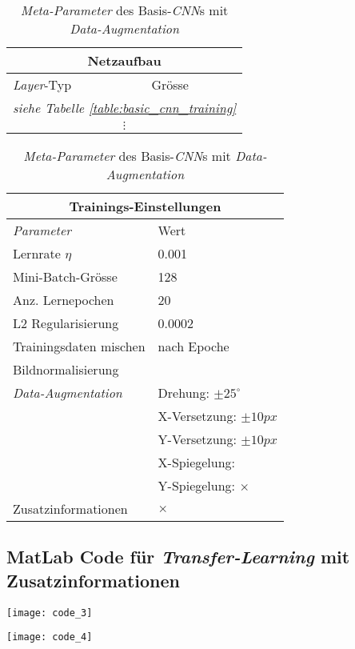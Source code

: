 \begin{table}[!htb]
	\def\arraystretch{1.4}
	\centering
	\begin{subtable}[t]{.5\linewidth}
		\begin{tabular}[t]{l | l }
			\multicolumn{2}{c}{\textbf{Netzaufbau}}\\
			\hline
			\textit{Layer}-Typ \qquad\quad\quad& Grösse\\
			\hline
			\hline
			\multicolumn{2}{c}{\qquad\qquad\qquad\quad\textit{siehe Tabelle \ref{table:basic_cnn_training}}\qquad\qquad\qquad\qquad}\\
			\multicolumn{2}{c}{$\vdots$}\\
			\hline
		\end{tabular}
	\end{subtable}%
	\begin{subtable}[t]{.5\linewidth}
		\begin{tabular}[t]{l | l }
			\multicolumn{2}{c}{\textbf{Trainings-Einstellungen}}\\
			\hline
			\textit{Parameter} & Wert\\
			\hline
			\hline
			Lernrate $\eta$ & 0.001\\
			Mini-Batch-Grösse & 128\\
			Anz. Lernepochen & 20\\
			L2 Regularisierung & 0.0002\\
			Trainingsdaten mischen& nach Epoche\\
			Bildnormalisierung & \checkmark\\
			\textit{Data-Augmentation}& Drehung: $\pm25^{\circ}$ \\
			& X-Versetzung: $\pm10px$ \\
			& Y-Versetzung: $\pm10px$ \\
			& X-Spiegelung: \checkmark \\
			& Y-Spiegelung: $\times$ \\
			Zusatzinformationen &  $\times$ \\
		\end{tabular}
	\end{subtable} 
	\caption{\textit{Meta-Parameter} des Basis-\textit{CNN}s mit \textit{Data-Augmentation}}
	\label{table:dataaug_training}
\end{table}
\newpage

\subsection*{MatLab Code für \textit{Transfer-Learning} mit Zusatzinformationen}

\texttt{[image: code\_3]}

\texttt{[image: code\_4]}